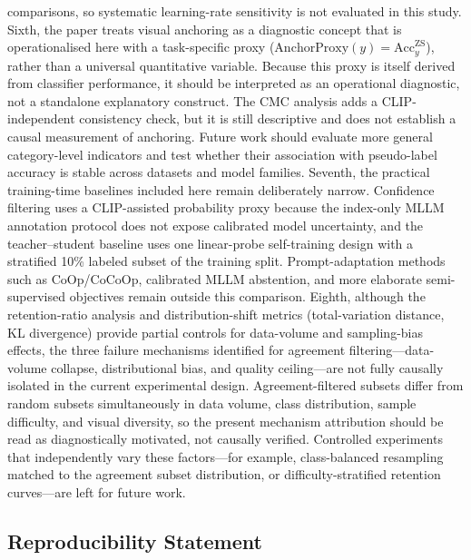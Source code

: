 \documentclass{ieeeaccess}
\begin{document}
comparisons, so systematic learning-rate sensitivity is not evaluated
in this study.
Sixth, the paper treats visual anchoring as a
diagnostic concept that is operationalised here with a task-specific
proxy ($\mathrm{AnchorProxy}(y)=\mathrm{Acc}^{\mathrm{ZS}}_{y}$), rather
than a universal quantitative variable.
Because this proxy is itself derived from classifier performance, it
should be interpreted as an operational diagnostic, not a
standalone explanatory construct.
The CMC analysis adds a CLIP-independent consistency check, but it is
still descriptive and does not establish a causal measurement of
anchoring.
Future work should evaluate more general category-level indicators and
test whether their association with pseudo-label accuracy is stable
across datasets and model families.
Seventh, the practical training-time baselines included here remain
deliberately narrow. Confidence filtering uses a CLIP-assisted
probability proxy because the index-only MLLM annotation protocol does
not expose calibrated model uncertainty, and the teacher--student
baseline uses one linear-probe self-training design with a stratified
10\% labeled subset of the training split.
Prompt-adaptation methods such as CoOp/CoCoOp, calibrated MLLM
abstention, and more elaborate semi-supervised objectives remain
outside this comparison.
Eighth, although the retention-ratio analysis and distribution-shift
metrics (total-variation distance, KL divergence) provide partial
controls for data-volume and sampling-bias effects, the three failure
mechanisms identified for agreement filtering---data-volume collapse,
distributional bias, and quality ceiling---are not fully causally
isolated in the current experimental design. Agreement-filtered
subsets differ from random subsets simultaneously in data volume,
class distribution, sample difficulty, and visual diversity, so the
present mechanism attribution should be read as diagnostically
motivated, not causally verified. Controlled experiments that
independently vary these factors---for example, class-balanced
resampling matched to the agreement subset distribution, or
difficulty-stratified retention curves---are left for future work.

\subsection{Reproducibility Statement}
\label{sec:repro}
\end{document}
